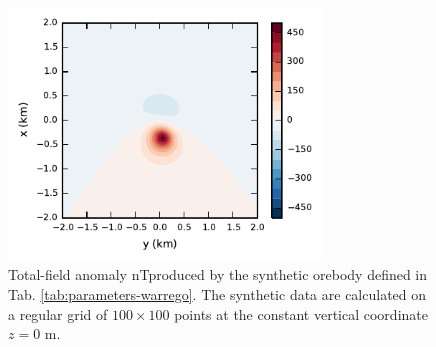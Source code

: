 \documentclass[gmd, manuscript]{copernicus}
\providecommand{\DIFadd}[1]{{\protect\color{blue}\uwave{#1}}} %
\providecommand{\DIFaddFL}[1]{\DIFadd{#1}} %
\providecommand{\DIFaddbeginFL}{} %
\providecommand{\DIFaddendFL}{} %
\begin{document}
\begin{figure}[t]
\DIFaddendFL \includegraphics[width=8.3cm]{figures/total-field_anomaly.pdf}
\caption{Total-field anomaly \DIFaddbeginFL \DIFaddFL{(in }\unit{nT}\DIFaddFL{) }\DIFaddendFL produced by the synthetic orebody
defined in Tab. \ref{tab:parameters-warrego}. The synthetic data
are calculated on a regular grid of $100 \times 100$ points
at the constant vertical coordinate $z = 0$ \unit{m}.}
\label{fig:tfa-warrego}
\end{figure}
\end{document}
